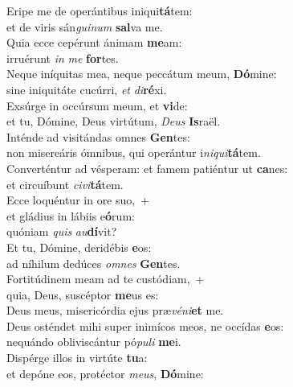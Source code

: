 \evenverse Eripe me de operántibus iniqui\textbf{tá}tem:~\*\\
\evenverse et de viris sán\textit{gui}\textit{num} \textbf{sal}va me.\\
\oddverse Quia ecce cepérunt ánimam \textbf{me}am:~\*\\
\oddverse irruérunt \textit{in} \textit{me} \textbf{for}tes.\\
\evenverse Neque iníquitas mea, neque peccátum meum, \textbf{Dó}mine:~\*\\
\evenverse sine iniquitáte cucúrri, \textit{et} \textit{di}\textbf{ré}xi.\\
\oddverse Exsúrge in occúrsum meum, et \textbf{vi}de:~\*\\
\oddverse et tu, Dómine, Deus virtútum, \textit{De}\textit{us} \textbf{Is}raël.\\
\evenverse Inténde ad visitándas omnes \textbf{Gen}tes:~\*\\
\evenverse non misereáris ómnibus, qui operántur i\textit{ni}\textit{qui}\textbf{tá}tem.\\
\oddverse Converténtur ad vésperam: et famem patiéntur ut \textbf{ca}nes:~\*\\
\oddverse et circuíbunt \textit{ci}\textit{vi}\textbf{tá}tem.\\
\evenverse Ecce loquéntur in ore suo,~+\\
\evenverse  et gládius in lábiis e\textbf{ó}rum:~\*\\
\evenverse quóniam \textit{quis} \textit{au}\textbf{dí}vit?\\
\oddverse Et tu, Dómine, deridébis \textbf{e}os:~\*\\
\oddverse ad níhilum dedúces \textit{om}\textit{nes} \textbf{Gen}tes.\\
\evenverse Fortitúdinem meam ad te custódiam,~+\\
\evenverse  quia, Deus, suscéptor \textbf{me}us es:~\*\\
\evenverse Deus meus, misericórdia ejus præ\textit{vé}\textit{ni}\textbf{et} me.\\
\oddverse Deus osténdet mihi super inimícos meos, ne occídas \textbf{e}os:~\*\\
\oddverse nequándo obliviscántur pó\textit{pu}\textit{li} \textbf{me}i.\\
\evenverse Dispérge illos in virtúte \textbf{tu}a:~\*\\
\evenverse et depóne eos, protéctor \textit{me}\textit{us}, \textbf{Dó}mine:\\
